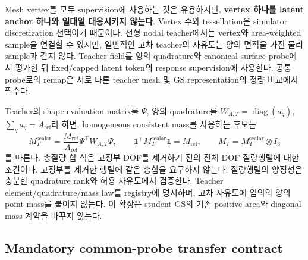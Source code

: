 \documentclass[11pt]{article}
\begin{document}
Mesh vertex를 모두 supervision에 사용하는 것은 유용하지만, \textbf{vertex 하나를 latent anchor 하나와
일대일 대응시키지 않는다}. Vertex 수와 tessellation은 simulator discretization 선택이기 때문이다.
선형 nodal teacher에서는 vertex와 area-weighted sample을 연결할 수 있지만, 일반적인 고차 teacher의
자유도는 양의 면적을 가진 물리 sample과 같지 않다. Teacher field를 양의 quadrature와 canonical
surface probe에서 평가한 뒤 fixed/capped latent token의 response supervision에 사용한다.
공통 probe로의 remap은 서로 다른 teacher mesh 및 GS representation의 정량 비교에서 필수다.

Teacher의 shape-evaluation matrix를 \(\Psi\), 양의 quadrature를
\(W_{A,T}=\operatorname{diag}(a_q)\), \(\sum_q a_q=A_{\mathrm{ref}}\)라 하면,
homogeneous consistent mass를 사용하는 후보는
\begin{equation}
  M_T^{\mathrm{scalar}}=\frac{M_{\mathrm{ref}}}{A_{\mathrm{ref}}}
  \Psi^\top W_{A,T}\Psi,\qquad
  \mathbf 1^\top M_T^{\mathrm{scalar}}\mathbf 1=M_{\mathrm{ref}},\qquad
  M_T=M_T^{\mathrm{scalar}}\otimes I_3
  \label{eq:rd-teacher-consistent-mass}
\end{equation}
를 따른다. 총질량 합 식은 고정부 DOF를 제거하기 전의 전체 DOF 질량행렬에 대한 조건이다.
고정부를 제거한 행렬에 같은 총합을 요구하지 않는다. 질량행렬의 양정성은 충분한 quadrature rank와
허용 자유도에서 검증한다.
Teacher element/quadrature/mass law를 registry에 명시하며, 고차 자유도에 임의의 양의 point mass를
붙이지 않는다. 이 확장은 student GS의 기존 positive area와 diagonal mass 계약을 바꾸지 않는다.

\subsection{Mandatory common-probe transfer contract}
\end{document}
